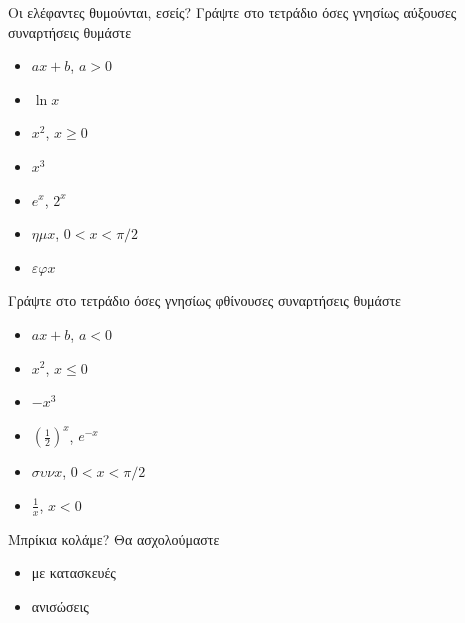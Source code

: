 \documentclass[greek]{beamer}
\begin{document}
\begin{frame}{Οι ελέφαντες θυμούνται, εσείς?}
 Γράψτε στο τετράδιο όσες γνησίως αύξουσες συναρτήσεις θυμάστε \pause
 \begin{multicols}{2}
  \begin{itemize}
   \item $ax+b$, $a>0$
   \item $\ln x$
   \item $x^2$, $x\ge 0$
   \item $x^3$
   \item $e^x$, $2^x$
   \item $ημ x$, $0< x< \pi/2$
   \item $εφ x$
  \end{itemize} \pause
 \end{multicols}

 Γράψτε στο τετράδιο όσες γνησίως φθίνουσες συναρτήσεις θυμάστε \pause
 \begin{multicols}{2}
  \begin{itemize}
   \item $ax+b$, $a<0$
   \item $x^2$, $x\le 0$
   \item $-x^3$
   \item $\left(\frac{1}{2}\right)^x$, $e^{-x}$
   \item $συν x$, $0< x< \pi/2$
   \item $\frac{1}{x}$, $x<0$
  \end{itemize}
 \end{multicols}
\end{frame}

\begin{frame}{Μπρίκια κολάμε?}
 Θα ασχολούμαστε
 \begin{itemize}
  \item με κατασκευές
  \item ανισώσεις
 \end{itemize}
\end{frame}
\end{document}
